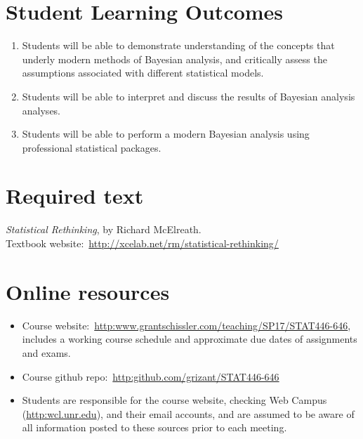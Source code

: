 \documentclass[11pt,onecolumn]{article}
\begin{document}
\section*{Student Learning Outcomes}
\begin{enumerate}
\item Students will be able to demonstrate understanding of the concepts that underly modern methods of Bayesian analysis, and critically assess the assumptions associated with different statistical models.
\item Students will be able to interpret and discuss the results of Bayesian analysis analyses.
\item Students will be able to perform a modern Bayesian analysis using professional statistical packages.
\end{enumerate}

\section*{Required text}
\emph{Statistical Rethinking}, by Richard McElreath. \\
Textbook website:~\url{http://xcelab.net/rm/statistical-rethinking/}

\section*{Online resources}
\begin{itemize}
\item Course website:~\url{http:www.grantschissler.com/teaching/SP17/STAT446-646}, includes a working course schedule and approximate due dates of assignments and exams.
\item Course github repo:~\url{http:github.com/grizant/STAT446-646}
\item Students are responsible for the course website, checking Web Campus (\url{http:wcl.unr.edu}), and their email accounts, and are assumed to be aware of all information posted to these sources prior to each meeting.
\end{itemize}
\end{document}
